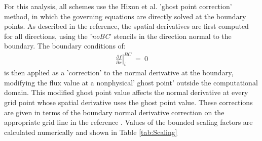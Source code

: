 \documentclass[conf]{new-aiaa}
\begin{document}
For this analysis, all schemes use the Hixon et al. 'ghost point correction' method, \cite{GPT, RDRP} in which the governing equations are directly solved at the boundary points. 
As described in the reference, the spatial derivatives are first computed for all directions, using the '\textit{noBC}' stencils in the direction normal to the boundary. 
The boundary conditions of:
\begin{equation}
	\begin{split}
		\label{eq:}
  			\left.\frac{\partial{f}}{\partial{x}}\right|_i^{BC}~=~0
	\end{split}
\end{equation}
is then applied as a 'correction' to the normal derivative at the boundary, modifying the flux value at a nonphysical' ghost point' outside the computational domain.
This modified ghost point value affects the normal derivative at every grid point whose spatial derivative uses the ghost point value. 
These corrections are given in terms of the boundary normal derivative correction on the appropriate grid line in the reference \cite{GPT, RDRP}. Values of the bounded scaling factors are calculated numerically and shown in Table \ref{tab:Scaling}
\end{document}
